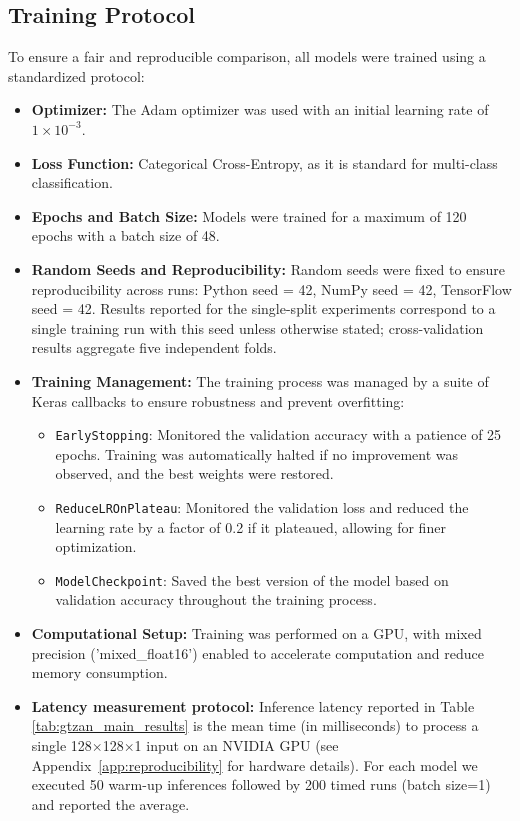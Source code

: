 \documentclass[11pt,a4paper]{article}
\begin{document}
\subsection{Training Protocol}
To ensure a fair and reproducible comparison, all models were trained using a standardized protocol:
\begin{itemize}
    \item \textbf{Optimizer:} The Adam optimizer was used with an initial learning rate of \(1 \times 10^{-3}\).
    \item \textbf{Loss Function:} Categorical Cross-Entropy, as it is standard for multi-class classification.
    \item \textbf{Epochs and Batch Size:} Models were trained for a maximum of 120 epochs with a batch size of 48.
    \item \textbf{Random Seeds and Reproducibility:} Random seeds were fixed to ensure reproducibility across runs: Python seed = 42, NumPy seed = 42, TensorFlow seed = 42. Results reported for the single-split experiments correspond to a single training run with this seed unless otherwise stated; cross-validation results aggregate five independent folds.
    \item \textbf{Training Management:} The training process was managed by a suite of Keras callbacks to ensure robustness and prevent overfitting:
    \begin{itemize}
        \item \texttt{EarlyStopping}: Monitored the validation accuracy with a patience of 25 epochs. Training was automatically halted if no improvement was observed, and the best weights were restored.
        \item \texttt{ReduceLROnPlateau}: Monitored the validation loss and reduced the learning rate by a factor of 0.2 if it plateaued, allowing for finer optimization.
        \item \texttt{ModelCheckpoint}: Saved the best version of the model based on validation accuracy throughout the training process.
    \end{itemize}
    \item \textbf{Computational Setup:} Training was performed on a GPU, with mixed precision ('mixed\_float16') enabled to accelerate computation and reduce memory consumption.
    \item \textbf{Latency measurement protocol:} Inference latency reported in Table \ref{tab:gtzan_main_results} is the mean time (in milliseconds) to process a single 128\(\times\)128\(\times\)1 input on an NVIDIA GPU (see Appendix~\ref{app:reproducibility} for hardware details). For each model we executed 50 warm-up inferences followed by 200 timed runs (batch size=1) and reported the average.
\end{itemize}
\end{document}
